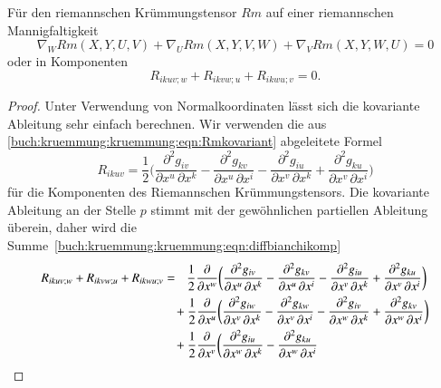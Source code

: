 \begin{satz}
Für den riemannschen Krümmungstensor $Rm$ auf einer riemannschen
Mannigfaltigkeit
\begin{equation}
\nabla_W Rm(X,Y,U,V)
+
\nabla_U Rm(X,Y,V,W)
+
\nabla_V Rm(X,Y,W,U)
=
0
\label{buch:kruemmung:kruemmung:eqn:diffbianchi}
\end{equation}
oder in Komponenten
\begin{equation}
R_{ikuv;w}
+
R_{ikvw;u}
+
R_{ikwu;v}
=
0.
\label{buch:kruemmung:kruemmung:eqn:diffbianchikomp}
\end{equation}
\end{satz}

\begin{proof}
Unter Verwendung von Normalkoordinaten lässt sich die kovariante
Ableitung sehr einfach berechnen.
Wir verwenden die aus 
\ref{buch:kruemmung:kruemmung:eqn:Rmkovariant}
abgeleitete Formel
\[
R_{ikuv}
=
\frac12
\biggl(
\frac{\partial^2 g_{iv}}{\partial x^u\,\partial x^k}
-
\frac{\partial^2 g_{kv}}{\partial x^u\,\partial x^i}
-
\frac{\partial^2 g_{iu}}{\partial x^v\,\partial x^k}
+
\frac{\partial^2 g_{ku}}{\partial x^v\,\partial x^i}
\biggr)
\]
für die Komponenten des Riemannschen Krümmungstensors.
Die kovariante Ableitung an der Stelle $p$ stimmt mit der gewöhnlichen
partiellen Ableitung überein, daher wird die
Summe~\eqref{buch:kruemmung:kruemmung:eqn:diffbianchikomp}
\bgroup
{}
\begin{align}
R_{ikuv;w}
+
R_{ikvw;u}
+
R_{ikwu;v}
&=\phantom{+}
\frac12
\frac{\partial}{\partial x^w}
\biggl(
\frac{\partial^2 g_{iv}}{\partial x^u\,\partial x^k}
-
\frac{\partial^2 g_{kv}}{\partial x^u\,\partial x^i}
-
\frac{\partial^2 g_{iu}}{\partial x^v\,\partial x^k}
+
\frac{\partial^2 g_{ku}}{\partial x^v\,\partial x^i}
\biggr)
\notag
\\
&\phantom{=}\,+
\frac12
\frac{\partial}{\partial x^u}
\biggl(
\frac{\partial^2 g_{iw}}{\partial x^v\,\partial x^k}
-
\frac{\partial^2 g_{kw}}{\partial x^v\,\partial x^i}
-
\frac{\partial^2 g_{iv}}{\partial x^w\,\partial x^k}
+
\frac{\partial^2 g_{kv}}{\partial x^w\,\partial x^i}
\biggr)
\notag
\\
&\phantom{=}\,+
\frac12
\frac{\partial}{\partial x^v}
\biggl(
\frac{\partial^2 g_{iu}}{\partial x^w\,\partial x^k}
-
\frac{\partial^2 g_{ku}}{\partial x^w\,\partial x^i}

\end{align}
\end{proof}
